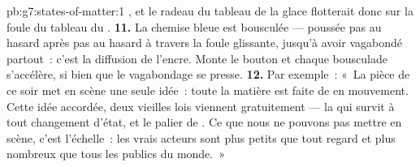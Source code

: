 \begin{solution}{pb:g7:states-of-matter:1}
, et le radeau du tableau de la glace flotterait donc sur la
foule du tableau du .
\textbf{11.} La chemise bleue est bousculée --- poussée pas au
hasard après pas au hasard à travers la foule glissante, jusqu'à
avoir vagabondé partout~: c'est la diffusion de l'encre. Monte le
bouton et chaque bousculade s'accélère, si bien que le vagabondage se
presse.
\textbf{12.} Par exemple~: «~La pièce de ce soir met en scène une
seule idée~: toute la matière est faite de  en mouvement.
Cette idée accordée, deux vieilles lois viennent gratuitement --- la
 qui survit à tout changement d'état, et le palier de . Ce
que nous ne pouvons pas mettre en scène, c'est l'échelle~: les vrais
acteurs sont plus petits que tout regard et plus nombreux que tous
les publics du monde.~»
\end{solution}
